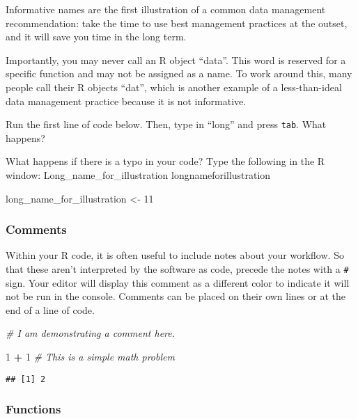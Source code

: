 \documentclass[
]{article}
\newenvironment{Shaded}{\begin{snugshade}}{\end{snugshade}}
\newcommand{\CommentTok}[1]{\textcolor[rgb]{0.56,0.35,0.01}{\textit{#1}}}
\newcommand{\DecValTok}[1]{\textcolor[rgb]{0.00,0.00,0.81}{#1}}
\newcommand{\NormalTok}[1]{#1}
\newcommand{\OperatorTok}[1]{\textcolor[rgb]{0.81,0.36,0.00}{\textbf{#1}}}
\newcommand{\StringTok}[1]{\textcolor[rgb]{0.31,0.60,0.02}{#1}}
\begin{document}
Informative names are the first illustration of a common data management
recommendation: take the time to use best management practices at the
outset, and it will save you time in the long term.

Importantly, you may never call an R object ``data''. This word is
reserved for a specific function and may not be assigned as a name. To
work around this, many people call their R objects ``dat'', which is
another example of a less-than-ideal data management practice because it
is not informative.

Run the first line of code below. Then, type in ``long'' and press
\texttt{tab}. What happens?

What happens if there is a typo in your code? Type the following in the
R window: Long\_name\_for\_illustration longnameforillustration

\begin{Shaded}
\begin{Highlighting}[]
\NormalTok{long_name_for_illustration <-}\StringTok{ }\DecValTok{11}
\end{Highlighting}
\end{Shaded}

\hypertarget{comments}{%
\subsubsection{Comments}\label{comments}}

Within your R code, it is often useful to include notes about your
workflow. So that these aren't interpreted by the software as code,
precede the notes with a \texttt{\#} sign. Your editor will display this
comment as a different color to indicate it will not be run in the
console. Comments can be placed on their own lines or at the end of a
line of code.

\begin{Shaded}
\begin{Highlighting}[]
\CommentTok{# I am demonstrating a comment here. }

\DecValTok{1} \OperatorTok{+}\StringTok{ }\DecValTok{1} \CommentTok{# This is a simple math problem}
\end{Highlighting}
\end{Shaded}

\begin{verbatim}
## [1] 2
\end{verbatim}

\hypertarget{functions}{%
\subsubsection{Functions}\label{functions}}
\end{document}
